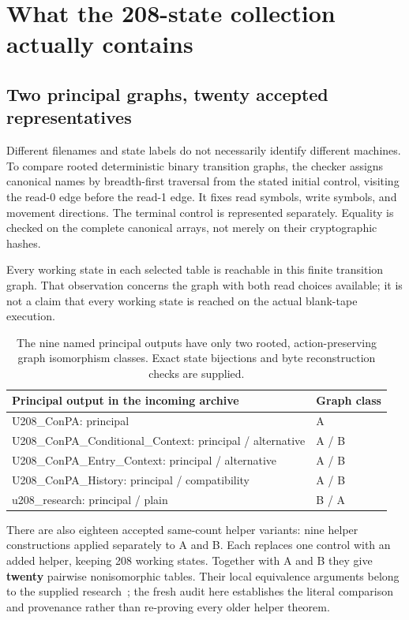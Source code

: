 \documentclass[11pt,letterpaper]{article}
\begin{document}
\section{What the 208-state collection actually contains}

\subsection{Two principal graphs, twenty accepted representatives}

Different filenames and state labels do not necessarily identify different
machines. To compare rooted deterministic binary transition graphs, the
checker assigns canonical names by breadth-first traversal from the stated
initial control, visiting the read-0 edge before the read-1 edge. It fixes
read symbols, write symbols, and movement directions. The terminal
control is represented separately. Equality is checked on the complete
canonical arrays, not merely on their cryptographic hashes.

Every working state in each selected table is reachable in this finite
transition graph. That observation concerns the graph with both read
choices available; it is not a claim that every working state is reached
on the actual blank-tape execution.

\begin{table}[ht]
\centering\small
\begin{tabular}{@{}p{4.45in}l@{}}
\toprule
Principal output in the incoming archive & Graph class\\
\midrule
U208\_ConPA: principal & A\\
U208\_ConPA\_Conditional\_Context: principal / alternative & A / B\\
U208\_ConPA\_Entry\_Context: principal / alternative & A / B\\
U208\_ConPA\_History: principal / compatibility & A / B\\
u208\_research: principal / plain & B / A\\
\bottomrule
\end{tabular}
\caption{The nine named principal outputs have only two rooted,
action-preserving graph isomorphism classes. Exact state bijections and
byte reconstruction checks are supplied.}
\end{table}

There are also eighteen accepted same-count helper variants: nine helper
constructions applied separately to A and B. Each replaces one control
with an added helper, keeping 208 working states. Together with A and B
they give \textbf{twenty} pairwise nonisomorphic tables. Their local
equivalence arguments belong to the supplied research~\cite{incoming}; the fresh audit
here establishes the literal comparison and provenance rather than
re-proving every older helper theorem.
\end{document}
